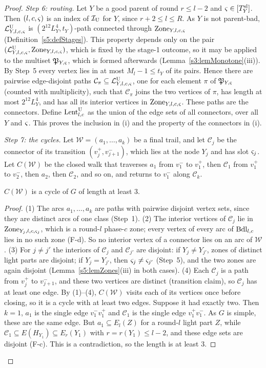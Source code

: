\begin{proof}
\emph{Step 6: routing.} Let $Y$ be a good parent of round $r\le l-2$ and $\varsigma\in[T^{\mathrm{sl}}_Y]$. Then $(l,c,\varsigma)$ is an index of $\mathcal{I}_{\mathrm{U}}$ for $Y$, since $r+2\le l\le R$. As $Y$ is not parent-bad, $\mathcal{L}^{\mathrm{U}}_{Y,l,c,\varsigma}$ is $(2^{12}L_Y^4,t_Y)$-path connected through $\mathrm{Zone}_{Y,l,c,\varsigma}$ (Definition~\ref{s5:defStages}). This property depends only on the pair $(\mathcal{L}^{\mathrm{U}}_{Y,l,c,\varsigma},\mathrm{Zone}_{Y,l,c,\varsigma})$, which is fixed by the stage-1 outcome, so it may be applied to the multiset $\mathfrak P_{Y,\varsigma}$, which is formed afterwards (Lemma~\ref{s3:lemMonotone}(iii)). By Step~5 every vertex lies in at most $M_l-1\le t_Y$ of its pairs. Hence there are pairwise edge-disjoint paths $\mathcal C_\pi\subseteq\mathcal{L}^{\mathrm{U}}_{Y,l,c,\varsigma}$, one for each element $\pi$ of $\mathfrak P_{Y,\varsigma}$ (counted with multiplicity), such that $\mathcal C_\pi$ joins the two vertices of $\pi$, has length at most $2^{12}L_Y^4$, and has all its interior vertices in $\mathrm{Zone}_{Y,l,c,\varsigma}$. These paths are the connectors. Define $\mathrm{Lent}^{\mathrm{U}}_{l,c}$ as the union of the edge sets of all connectors, over all $Y$ and $\varsigma$. This proves the inclusion in (i) and the property of the connectors in (i).

\emph{Step 7: the cycles.} Let $\mathcal W=(a_1,\dots,a_k)$ be a final trail, and let $\mathcal C_j$ be the connector of its transition $(v_j^+,v_{j+1}^-)$, which lies at the node $Y_j$ and has slot $\varsigma_j$. Let $C(\mathcal W)$ be the closed walk that traverses $a_1$ from $v_1^-$ to $v_1^+$, then $\mathcal C_1$ from $v_1^+$ to $v_2^-$, then $a_2$, then $\mathcal C_2$, and so on, and returns to $v_1^-$ along $\mathcal C_k$.

\begin{claim}[cycles]
$C(\mathcal W)$ is a cycle of $G$ of length at least $3$.
\end{claim}
\begin{proof}
(1) The arcs $a_1,\dots,a_k$ are paths with pairwise disjoint vertex sets, since they are distinct arcs of one class (Step~1). (2) The interior vertices of $\mathcal C_j$ lie in $\mathrm{Zone}_{Y_j,l,c,\varsigma_j}$, which is a round-$l$ phase-$c$ zone; every vertex of every arc of $\mathrm{Bdl}_{l,c}$ lies in no such zone (F-d). So no interior vertex of a connector lies on an arc of $\mathcal W$. (3) For $j\ne j'$ the interiors of $\mathcal C_j$ and $\mathcal C_{j'}$ are disjoint: if $Y_j\ne Y_{j'}$, zones of distinct light parts are disjoint; if $Y_j=Y_{j'}$, then $\varsigma_j\ne\varsigma_{j'}$ (Step~5), and the two zones are again disjoint (Lemma~\ref{s5:lemZones}(iii) in both cases). (4) Each $\mathcal C_j$ is a path from $v_j^+$ to $v_{j+1}^-$, and these two vertices are distinct (transition claim), so $\mathcal C_j$ has at least one edge. By (1)--(4), $C(\mathcal W)$ visits each of its vertices once before closing, so it is a cycle with at least two edges. Suppose it had exactly two. Then $k=1$, $a_1$ is the single edge $v_1^-v_1^+$ and $\mathcal C_1$ is the single edge $v_1^+v_1^-$. As $G$ is simple, these are the same edge. But $a_1\subseteq E_l(Z)$ for a round-$l$ light part $Z$, while $\mathcal C_1\subseteq E(H_{Y_1})\subseteq E_{r}(Y_1)$ with $r=r(Y_1)\le l-2$, and these edge sets are disjoint (F-c). This is a contradiction, so the length is at least $3$.
\end{proof}


\end{proof}
